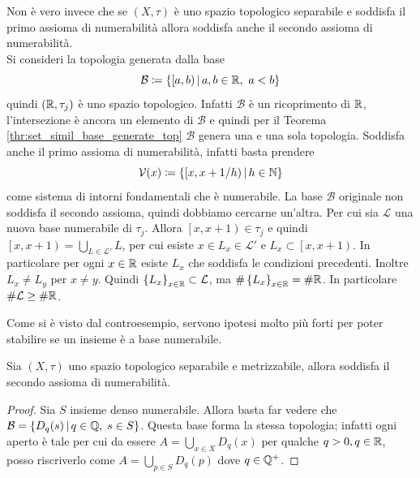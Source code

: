 \begin{remark}
	Non è vero invece che se $(X,\tau)$ è uno spazio topologico separabile e soddisfa il primo assioma di numerabilità allora soddisfa anche il secondo assioma di numerabilità. \\
	Si consideri la topologia generata dalla base
	\begin{equation*}
		\mathcal{B} \coloneqq \left\{ \left[a,b\right) \,\middle|\, a,b \in \mathbb{R},\ a < b \right\}
	\end{equation*}  
	quindi $(\mathbb{R}, \tau_j)$ è uno spazio topologico. Infatti $\mathcal{B}$ è un ricoprimento di $\mathbb{R}$, l'intersezione è ancora un elemento di $\mathcal{B}$ e quindi per il Teorema \ref{thr:set_simil_base_generate_top} $\mathcal{B}$ genera una e una sola topologia. Soddisfa anche il primo assioma di numerabilità, infatti basta prendere 
	\begin{equation*}
		\mathcal{V}(x) \coloneqq \left\{\left[x, x+1/h\right) \,\middle|\, h \in \mathbb{N} \right\}
	\end{equation*}
	come sistema di intorni fondamentali che è numerabile. La base $\mathcal{B}$ originale non soddisfa il secondo assioma, quindi dobbiamo cercarne un'altra. Per cui sia $\mathcal{L}$ una nuova base numerabile di $\tau_j$. Allora $\left[x, x+1\right) \in \tau_j$ e quindi $\left[x, x+1\right) = \bigcup_{L \in \mathcal{L}'} L$, per cui esiste $x \in L_x \in \mathcal{L}'$ e $L_x \subset \left[x,x+1\right)$. In particolare per ogni $x \in \mathbb{R}$ esiste $L_x$ che soddisfa le condizioni precedenti. Inoltre $L_x \neq L_y$ per $x \neq y$. Quindi $ \left\{L_x\right\}_{x\in \mathbb{R}} \subset \mathcal{L}$, ma $\# \left\{L_x\right\}_{x\in \mathbb{R}} = \# \mathbb{R}$. In particolare $\# \mathcal{L} \ge \#\mathbb{R}$.
\end{remark}

Come si è visto dal controesempio, servono ipotesi molto più forti per poter stabilire se un insieme è a base numerabile.

\begin{theorem}
	Sia $(X, \tau)$ uno spazio topologico separabile e metrizzabile, allora soddisfa il secondo assioma di numerabilità.
\end{theorem}
\begin{proof}
	Sia $S$ insieme denso numerabile. Allora basta far vedere che $\mathcal{B} = \left\{ D_q(s) \,\middle|\, q \in \mathbb{Q}, \; s \in S\right\}$. Questa base forma la stessa topologia; infatti ogni aperto è tale per cui da essere $A = \bigcup_{x \in X} D_q(x)$ per qualche $q > 0, q\in \mathbb{R}$, posso riscriverlo come $A = \bigcup_{p \in S} D_q(p)$ dove $q \in \mathbb{Q}^+$.
\end{proof}



